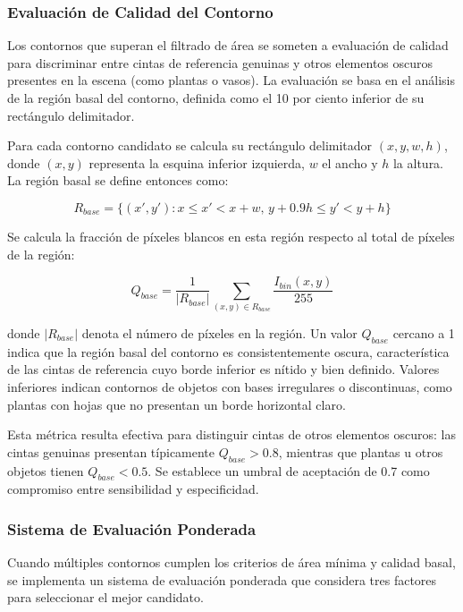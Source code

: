 \subsubsection{Evaluación de Calidad del Contorno}

Los contornos que superan el filtrado de área se someten a evaluación de calidad para discriminar entre cintas de referencia genuinas y otros elementos oscuros presentes en la escena (como plantas o vasos). La evaluación se basa en el análisis de la región basal del contorno, definida como el 10 por ciento inferior de su rectángulo delimitador.

Para cada contorno candidato se calcula su rectángulo delimitador $(x, y, w, h)$, donde $(x,y)$ representa la esquina inferior izquierda, $w$ el ancho y $h$ la altura. La región basal se define entonces como:

\begin{equation}
R_{base} = \{(x',y') : x \leq x' < x+w, \, y+0.9h \leq y' < y+h\}
\end{equation}

Se calcula la fracción de píxeles blancos en esta región respecto al total de píxeles de la región:

\begin{equation}
Q_{base} = \frac{1}{|R_{base}|} \sum_{(x,y) \in R_{base}} \frac{I_{bin}(x,y)}{255}
\end{equation}

donde $|R_{base}|$ denota el número de píxeles en la región. Un valor $Q_{base}$ cercano a 1 indica que la región basal del contorno es consistentemente oscura, característica de las cintas de referencia cuyo borde inferior es nítido y bien definido. Valores inferiores indican contornos de objetos con bases irregulares o discontinuas, como plantas con hojas que no presentan un borde horizontal claro.

Esta métrica resulta efectiva para distinguir cintas de otros elementos oscuros: las cintas genuinas presentan típicamente $Q_{base} > 0.8$, mientras que plantas u otros objetos tienen $Q_{base} < 0.5$. Se establece un umbral de aceptación de 0.7 como compromiso entre sensibilidad y especificidad.

\subsubsection{Sistema de Evaluación Ponderada}

Cuando múltiples contornos cumplen los criterios de área mínima y calidad basal, se implementa un sistema de evaluación ponderada que considera tres factores para seleccionar el mejor candidato.

